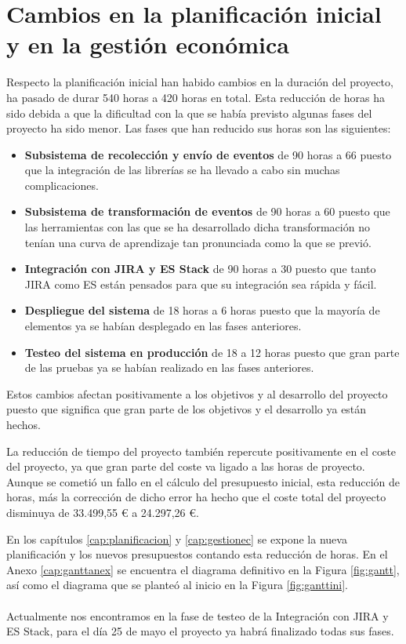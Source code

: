 \section{Cambios en la planificación inicial y en la gestión económica}

Respecto la planificación inicial han habido cambios en la duración del proyecto, ha pasado de durar 540 horas a 420 horas en total. Esta reducción de horas ha sido debida a que la dificultad con la que se había previsto algunas fases del proyecto ha sido menor. Las fases que han reducido sus horas son las siguientes:

\begin{itemize}
	\item \textbf{Subsistema de recolección y envío de eventos} de 90 horas a 66 puesto que la integración de las librerías se ha llevado a cabo sin muchas complicaciones.
	
	\item \textbf{Subsistema de transformación de eventos} de 90 horas a 60 puesto que las herramientas con las que se ha desarrollado dicha transformación no tenían una curva de aprendizaje tan pronunciada como la que se previó.
	
	\item \textbf{Integración con JIRA y ES Stack} de 90 horas a 30 puesto que tanto JIRA como ES están pensados para que su integración sea rápida y fácil.
	
	\item \textbf{Despliegue del sistema} de 18 horas a 6 horas puesto que la mayoría de elementos ya se habían desplegado en las fases anteriores.
	
	\item \textbf{Testeo del sistema en producción} de 18 a 12 horas puesto que gran parte de las pruebas ya se habían realizado en las fases anteriores.
\end{itemize}

Estos cambios afectan positivamente a los objetivos y al desarrollo del proyecto puesto que significa que gran parte de los objetivos y el desarrollo ya están hechos.

La reducción de tiempo del proyecto también repercute positivamente en el coste del proyecto, ya que gran parte del coste va ligado a las horas de proyecto. Aunque se cometió un fallo en el cálculo del presupuesto inicial, esta reducción de horas, más la corrección de dicho error ha hecho que el coste total del proyecto disminuya de 33.499,55 € a 24.297,26 €.

En los capítulos \ref{cap:planificacion} y \ref{cap:gestionec} se expone la nueva planificación y los nuevos presupuestos contando esta reducción de horas. En el Anexo \ref{cap:ganttanex} se encuentra el diagrama definitivo en la Figura \ref{fig:gantt}, así como el diagrama que se planteó al inicio en la Figura \ref{fig:ganttini}.
 \\ \\
Actualmente nos encontramos en la fase de testeo de la Integración con JIRA y ES Stack, para el día 25 de mayo el proyecto ya habrá finalizado todas sus fases.
